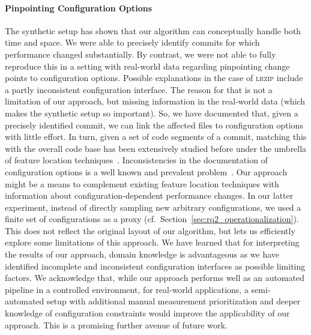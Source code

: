 \documentclass[sigconf]{acmart}
\begin{document}
	\paragraph{Pinpointing Configuration Options}
	The synthetic setup has shown that our algorithm can conceptually handle both time and space. We were able to precisely identify commits for which performance changed substantially. By contrast, we were not able to fully reproduce this in a setting with real-world data regarding pinpointing change points to configuration options. Possible explanations in the case of \textsc{lrzip} include a partly inconsistent configuration interface. 
	The reason for that is not a limitation of our approach, but missing information in the real-world data (which makes the synthetic setup so important). So, we have documented that, given a precisely identified commit, we can link the affected files to configuration options with little effort. In turn, given a set of code segments of a commit, matching this with the overall code base has been extensively studied before under the umbrella of feature location techniques~\cite{hill_which_2013}.
	Inconsistencies in the documentation of configuration options is a well known and prevalent problem~\cite{rabkin_static_2011}. Our approach might be a means to complement existing feature location techniques with information about configuration-dependent performance changes. 	
	In our latter experiment, instead of directly sampling new arbitrary configurations, we used a finite set of configurations as a proxy (cf.~Section~\ref{sec:rq2_operationalization}). This does not reflect the original layout of our algorithm, but lets us efficiently explore some limitations of this approach. We have learned that for interpreting the results of our approach, domain knowledge is advantageous as we have identified incomplete and inconsistent configuration interfaces as possible limiting factors. We acknowledge that, while our approach performs well as an automated pipeline in a controlled environment, for real-world applications, a semi-automated setup with additional manual measurement prioritization and deeper knowledge of configuration constraints would improve the applicability of our approach. This is a promising further avenue of future work.
	
\end{document}
